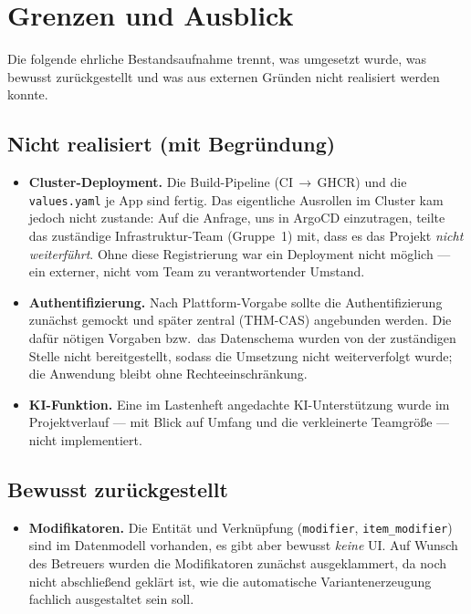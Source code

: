 \documentclass[11pt,a4paper]{article}
\begin{document}
\section{Grenzen und Ausblick}\label{sec:grenzen}

Die folgende ehrliche Bestandsaufnahme trennt, was umgesetzt wurde, was bewusst
zurückgestellt und was aus externen Gründen nicht realisiert werden konnte.

\subsection{Nicht realisiert (mit Begründung)}
\begin{itemize}
  \item \textbf{Cluster-Deployment.} Die Build-Pipeline (CI\,$\rightarrow$\,GHCR)
  und die \texttt{values.yaml} je App sind fertig. Das eigentliche Ausrollen im
  Cluster kam jedoch nicht zustande: Auf die Anfrage, uns in ArgoCD einzutragen,
  teilte das zuständige Infrastruktur-Team (Gruppe~1) mit, dass es das Projekt
  \emph{nicht weiterführt}. Ohne diese Registrierung war ein Deployment nicht
  möglich --- ein externer, nicht vom Team zu verantwortender Umstand.
  \item \textbf{Authentifizierung.} Nach Plattform-Vorgabe sollte die
  Authentifizierung zunächst gemockt und später zentral (THM-CAS) angebunden
  werden. Die dafür nötigen Vorgaben bzw.\ das Datenschema wurden von der
  zuständigen Stelle nicht bereitgestellt, sodass die Umsetzung nicht
  weiterverfolgt wurde; die Anwendung bleibt ohne Rechteeinschränkung.
  \item \textbf{KI-Funktion.} Eine im Lastenheft angedachte KI-Unterstützung
  wurde im Projektverlauf --- mit Blick auf Umfang und die verkleinerte
  Teamgröße --- nicht implementiert.
\end{itemize}

\subsection{Bewusst zurückgestellt}
\begin{itemize}
  \item \textbf{Modifikatoren.} Die Entität und Verknüpfung (\texttt{modifier},
  \texttt{item\_modifier}) sind im Datenmodell vorhanden, es gibt aber bewusst
  \emph{keine} UI. Auf Wunsch des Betreuers wurden die Modifikatoren zunächst
  ausgeklammert, da noch nicht abschließend geklärt ist, wie die automatische
  Variantenerzeugung fachlich ausgestaltet sein soll.
\end{itemize}
\end{document}
